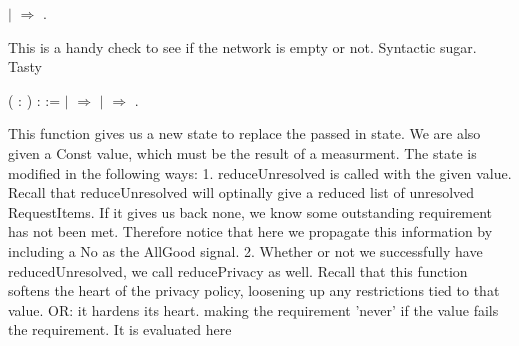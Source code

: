 \documentclass[12pt]{report}
\begin{document}
\begin{coqdoccode}
\coqdocindent{11.00em}
\ensuremath{|} \coqdocvar{\_}\coqdocvar{\_} \ensuremath{\Rightarrow}    \coqdoceol
\coqdocindent{11.00em}
\coqdoceol
\coqdocindent{9.00em}
\coqdoceol
\coqdocnoindent
{}.\coqdoceol
\coqdocemptyline
\end{coqdoccode}
This is a handy check to see if the network is empty or not. Syntactic sugar. Tasty\begin{coqdoccode}
\coqdocnoindent
{}  (  : ) :  :=\coqdoceol
\coqdocindent{0.50em}
  \coqdoceol
\coqdocindent{0.50em}
\ensuremath{|}  \ensuremath{\Rightarrow} \coqdoceol
\coqdocindent{0.50em}
\ensuremath{|}    \ensuremath{\Rightarrow} \coqdoceol
\coqdocnoindent
{}.\coqdoceol
\coqdocemptyline
\end{coqdoccode}
This function gives us a new state to replace the passed in state. We are also
given a Const value, which must be the result of a measurment. The state is modified
in the following ways:
1. reduceUnresolved is called with the given value. Recall that reduceUnresolved will optinally
give a reduced list of unresolved RequestItems. If it gives us back none, we know some outstanding requirement
has not been met. Therefore notice that here we propagate this information by including a No as the AllGood
signal.  
2. Whether or not we successfully have reducedUnresolved, we call reducePrivacy as well. Recall that this function
softens the heart of the privacy policy, loosening up any restrictions tied to that value.
OR: it hardens its heart. making the requirement 'never' if the value fails the requirement. It is evaluated here 
\end{document}
